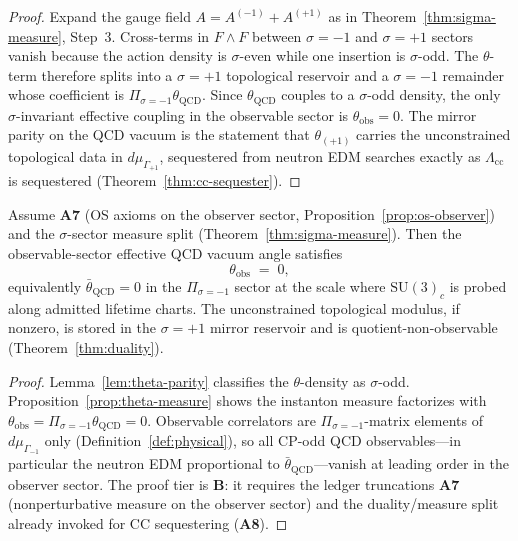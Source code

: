 \begin{proof}
Expand the gauge field $A=A^{(-1)}+A^{(+1)}$ as in
Theorem~\ref{thm:sigma-measure}, Step~3. Cross-terms in $F\wedge F$ between
$\sigma=-1$ and $\sigma=+1$ sectors vanish because the action density is
$\sigma$-even while one insertion is $\sigma$-odd. The $\theta$-term therefore
splits into a $\sigma=+1$ topological reservoir and a $\sigma=-1$ remainder
whose coefficient is $\Pi_{\sigma=-1}\theta_{\mathrm{QCD}}$. Since
$\theta_{\mathrm{QCD}}$ couples to a $\sigma$-odd density, the only
$\sigma$-invariant effective coupling in the observable sector is
$\theta_{\mathrm{obs}}=0$. The mirror parity on the QCD vacuum is the
statement that $\theta_{(+1)}$ carries the unconstrained topological data in
$d\mu_{\Gamma_{+1}}$, sequestered from neutron EDM searches exactly as
$\Lambda_{\mathrm{cc}}$ is sequestered (Theorem~\ref{thm:cc-sequester}).
\end{proof}

\begin{theorem}\label{thm:strong-cp}
Assume \textbf{A7} (OS axioms on the observer sector,
Proposition~\ref{prop:os-observer}) and the $\sigma$-sector measure split
(Theorem~\ref{thm:sigma-measure}). Then the observable-sector effective QCD
vacuum angle satisfies
\begin{equation}\label{eq:theta-zero}
  \theta_{\mathrm{obs}} \;=\; 0,
\end{equation}
equivalently $\bar\theta_{\mathrm{QCD}}=0$ in the $\Pi_{\sigma=-1}$ sector
at the scale where $\mathrm{SU}(3)_c$ is probed along admitted lifetime charts.
The unconstrained topological modulus, if nonzero, is stored in the
$\sigma=+1$ mirror reservoir and is quotient-non-observable
(Theorem~\ref{thm:duality}).
\end{theorem}

\begin{proof}
Lemma~\ref{lem:theta-parity} classifies the $\theta$-density as $\sigma$-odd.
Proposition~\ref{prop:theta-measure} shows the instanton measure factorizes
with $\theta_{\mathrm{obs}}=\Pi_{\sigma=-1}\theta_{\mathrm{QCD}}=0$.
Observable correlators are $\Pi_{\sigma=-1}$-matrix elements of
$d\mu_{\Gamma_{-1}}$ only (Definition~\ref{def:physical}), so all
CP-odd QCD observables---in particular the neutron EDM proportional to
$\bar\theta_{\mathrm{QCD}}$---vanish at leading order in the observer sector.
The proof tier is \textbf{B}: it requires the ledger truncations \textbf{A7}
(nonperturbative measure on the observer sector) and the duality/measure split
already invoked for CC sequestering (\textbf{A8}).
\end{proof}

